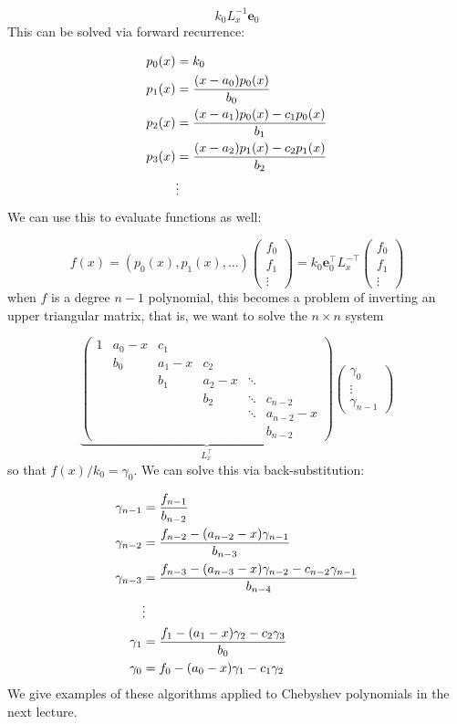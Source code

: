 \documentclass[12pt,a4paper]{article}
\begin{document}
\[
k_0 L_x^{-1} \mathbf{ e}_0
\]
This  can be solved  via forward recurrence:


\begin{align*}
    p_0(x) &= k_0 \\
    p_1(x) &= {(x-a_0) p_0(x) \over b_0}\\
    p_2(x) &= {(x-a_1) p_0(x) - c_1 p_0(x) \over b_1}\\
    p_3(x) &= {(x-a_2) p_1(x) - c_2 p_1(x) \over b_2}\\
    &\vdots
\end{align*}
We can use this to evaluate functions as well:

\[
f(x) = (p_0(x),p_1(x),\ldots) \begin{pmatrix}f_0 \\ f_1\\ \vdots \end{pmatrix} =
k_0 \mathbf{e}_0^\top L_x^{-\top}  \begin{pmatrix}f_0 \\ f_1\\ \vdots \end{pmatrix}
\]
when $f$ is a degree $n-1$ polynomial, this becomes a problem of inverting an upper triangular matrix, that is, we want to solve the $n \times n$ system

\[
\underbrace{\begin{pmatrix}
1 & a_0-x & c_1 \\
& b_0 & a_1-x & c_2  \\
& & b_1 & a_2-x & \ddots  \\
& &     & b_2 & \ddots & c_{n-2} \\
&&&&\ddots & a_{n-2}-x \\
&&&&& b_{n-2}
\end{pmatrix}}_{L_x^\top} \begin{pmatrix} \gamma_0 \\\vdots\\ \gamma_{n-1} \end{pmatrix}
\]
so that $f(x)/k_0 = \gamma_0$. We can solve this  via back-substitution:


\begin{align*}
\gamma_{n-1} &= {f_{n-1} \over b_{n-2}} \\
\gamma_{n-2} &= {f_{n-2} - (a_{n-2}-x) \gamma_{n-1} \over b_{n-3}} \\
\gamma_{n-3} &= {f_{n-3} - (a_{n-3}-x) \gamma_{n-2} - c_{n-2} \gamma_{n-1} \over b_{n-4}} \\
& \vdots \\
\gamma_1 &= {f_1 - (a_1-x) \gamma_2 - c_2 \gamma_3 \over b_0} \\
\gamma_0 &= f_0 - (a_0-x) \gamma_1 - c_1 \gamma_2
\end{align*}
We give examples of these algorithms applied to Chebyshev polynomials in the next lecture.
\end{document}
